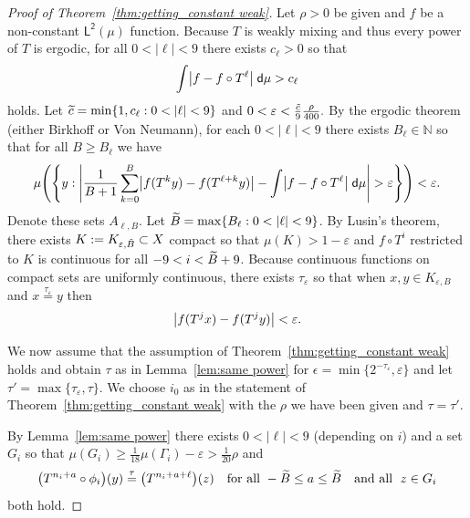 \documentclass[AHL,Unicode,longabstracts,published]{cedram}
\newcommand{\N}{\mathbb{N}}
\newcommand{\intd}{\;\mathsf{d}}
\newcommand{\lp}{\mathsf{L}}
\newcommand{\ltwo}{\lp^{\!\mathsf{2}}}
\let\originalleft\left
\let\originalright\right
\renewcommand{\left}{\mathopen{}\mathclose\bgroup\originalleft}
\renewcommand{\right}{\aftergroup\egroup\originalright}
\let\oldtilde\tilde
\renewcommand*{\tilde}[1]{\mathchoice{\widetilde{#1}}{\widetilde{#1}}{\oldtilde{#1}}{\oldtilde{#1}}}
\begin{document}
\begin{proof}[Proof of Theorem~\ref{thm:getting_constant weak}]
Let $\rho>0$ be given and $f$ be a non-constant $\ltwo(\mu)$ function. Because $T$ is weakly mixing and thus every power of $T$ is ergodic, for all $0<|\ell|<9$ there exists $c_\ell>0$ so that
\[
\int \left|f-f\circ T^\ell\right| \intd \mu>c_\ell
\]
holds. Let $\tilde{c}=\min\{1,c_\ell:0<|\ell|<9\}$ and $0<\varepsilon<\frac{\tilde{c}}9 \frac{\rho}{400}.$ By the ergodic theorem (either Birkhoff or Von Neumann), for each $0<|\ell|<9$ there exists $B_\ell \in \N$ so that for all $B\geq B_\ell$ we have
\begin{equation}\label{eq:erg}
\mu \left(\left\{ y : \left|\frac 1 {B+1} \sum_{k=0}^{B} \left|f(T^{k}y)-f(T^{\ell+k}y)\right|-\int\left|f-f \circ T^{\ell}\right| \intd\mu\right|>\varepsilon\right\} \right) < \varepsilon.
\end{equation}
Denote these sets $A_{\ell,B}$. Let $\tilde{B}=\max\{B_\ell:0<|\ell|<9\}$. By Lusin's theorem, there exists $K:=K_{\varepsilon,\tilde{B}}\subset X$ compact so that $\mu(K)>1-\varepsilon$ and $f\circ T^i$ restricted to $K$ is continuous for all $-9<i<\tilde{B}+9$. Because continuous functions on compact sets are uniformly continuous, there exists $\tau_{\varepsilon}$ so that when $x,y \in K_{\varepsilon,B}$ and $x \overset{\tau_{\varepsilon}}{=} y$ then
\begin{equation}\label{eq:all close}
\left|f(T^jx)-f(T^jy)\right|<\varepsilon.
\end{equation}


We now assume that the assumption of Theorem~\ref{thm:getting_constant weak} holds and obtain $\tau$ as in Lemma~\ref{lem:same power} for $\epsilon=\min\{2^{-\tau_{\varepsilon}},\varepsilon\}$ and let $\tau'=\max\{\tau_{\varepsilon},\tau\}.$ We choose $i_0$ as in the statement of Theorem~\ref{thm:getting_constant weak} with the $\rho$ we have been given and $\tau=\tau'$.

By Lemma~\ref{lem:same power} there exists $0<|\ell|<9$ (depending on $i$) and a set $G_i$ so that $\mu(G_i)\geq \frac 1 {18}\mu(\Gamma_i)-\varepsilon>\frac{1}{20} \rho$ and
\begin{equation}\label{eq:specific ell}
\left(T^{n_i+a} \circ \phi_i\right)(y) \overset{\tau}{=} \left(T^{n_i+a+\ell}\right)(z)\quad
\text{for all } -\tilde{B}\leq a \leq \tilde{B} \quad\text{and all }\; z \in G_i
\end{equation}
both hold.


\end{proof}
\end{document}
